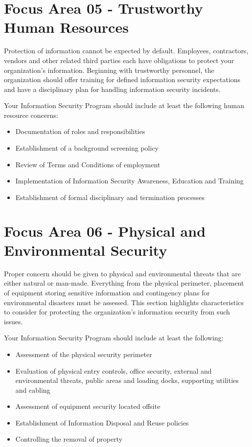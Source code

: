 \documentclass{needs}
\begin{document}
		
		\fFourTable
		
	\section{Focus Area 05 - Trustworthy Human Resources}
	
		Protection of information cannot be expected by default. Employees, contractors, vendors and other related third parties each have obligations to protect your organization’s information.  Beginning with trustworthy personnel, the organization should offer training for defined information security expectations and have a disciplinary plan for handling information security incidents.
		
		Your Information Security Program should include at least the following human resource concerns: 
		\begin{itemize}
			\item Documentation of roles and responsibilities
			\item Establishment of a background screening policy
			\item Review of Terms and Conditions of employment
			\item Implementation of Information Security Awareness, Education and Training
			\item Establishment of formal disciplinary and termination processes
		\end{itemize}
		
		
		\fFiveTable	
		
	\section{Focus Area 06 - Physical and Environmental Security}
	
		Proper concern should be given to physical and environmental threats that are either natural or man-made.  Everything from the physical perimeter, placement of equipment storing sensitive information and contingency plans for environmental disasters must be assessed.  This section highlights characteristics to consider for protecting the organization’s information security from such issues.
		
		Your Information Security Program should include at least the following: 
		\begin{itemize}
			\item Assessment of the physical security perimeter
			\item Evaluation of physical entry controls, office security, external and environmental threats, public areas and loading docks, supporting utilities and cabling
			\item Assessment of equipment security located offsite
			\item Establishment of Information Disposal and Reuse policies
			\item Controlling the removal of property
		\end{itemize}
		
\end{document}
